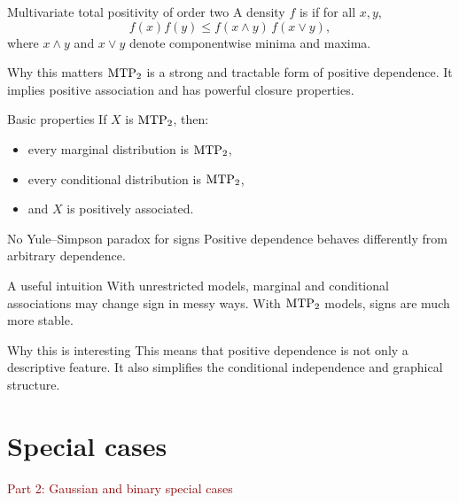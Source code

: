 \documentclass[dvipsnames,aspectratio=169,handout]{beamer}
\begin{document}
\begin{frame}{Multivariate total positivity of order two}
A density $f$ is \imp{$\mtp$} if for all $x,y$,
\[
f(x)f(y)\leq f(x\wedge y)\,f(x\vee y),
\]
where $x\wedge y$ and $x\vee y$ denote componentwise minima and maxima.

\begin{block}{Why this matters}
$\mtp$ is a strong and tractable form of positive dependence.
It implies positive association and has powerful closure properties.
\end{block}

\begin{alertblock}{Basic properties}
If $X$ is $\mtp$, then:
\begin{itemize}
    \item every marginal distribution is $\mtp$,
    \item every conditional distribution is $\mtp$,
    \item and $X$ is positively associated.
\end{itemize}
\end{alertblock}
\end{frame}

\begin{frame}{No Yule--Simpson paradox for signs}
Positive dependence behaves differently from arbitrary dependence.

\begin{block}{A useful intuition}
With unrestricted models, marginal and conditional associations may change sign in messy ways.
With $\mtp$ models, signs are much more stable.
\end{block}

\begin{alertblock}{Why this is interesting}
This means that positive dependence is not only a descriptive feature.
It also simplifies the conditional independence and graphical structure.
\end{alertblock}
\end{frame}


\section{Special cases}

\begin{frame}{}
\begin{center}
{\Huge \textcolor{DarkRed}{Part 2: Gaussian and binary special cases}}
\end{center}
\end{frame}
\end{document}
